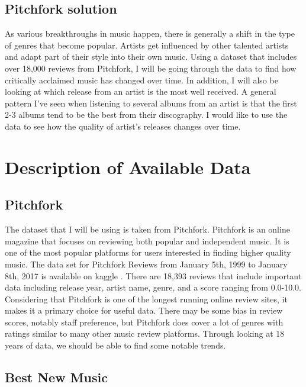 \documentclass{article}
\begin{document}
\hypertarget{pitchfork-solution}{%
\subsection{Pitchfork solution}\label{pitchfork-solution}}

As various breakthroughs in music happen, there is generally a shift in
the type of genres that become popular. Artists get influenced by other
talented artists and adapt part of their style into their own music.
Using a dataset that includes over 18,000 reviews from Pitchfork, I will
be going through the data to find how critically acclaimed music has
changed over time. In addition, I will also be looking at which release
from an artist is the most well received. A general pattern I've seen
when listening to several albums from an artist is that the first 2-3
albums tend to be the best from their discography. I would like to use
the data to see how the quality of artist's releases changes over time.

\hypertarget{description-of-available-data}{%
\section{Description of Available
Data}\label{description-of-available-data}}

\hypertarget{pitchfork}{%
\subsection{Pitchfork}\label{pitchfork}}

The dataset that I will be using is taken from Pitchfork. Pitchfork is
an online magazine that focuses on reviewing both popular and
independent music. It is one of the most popular platforms for users
interested in finding higher quality music. The data set for Pitchfork
Reviews from January 5th, 1999 to January 8th, 2017 is available on
kaggle \citep{kaggle}. There are 18,393 reviews that include important
data including release year, artist name, genre, and a score ranging
from 0.0-10.0. Considering that Pitchfork is one of the longest running
online review sites, it makes it a primary choice for useful data. There
may be some bias in review scores, notably staff preference, but
Pitchfork does cover a lot of genres with ratings similar to many other
music review platforms. Through looking at 18 years of data, we should
be able to find some notable trends.

\hypertarget{best-new-music}{%
\subsection{Best New Music}\label{best-new-music}}
\end{document}
